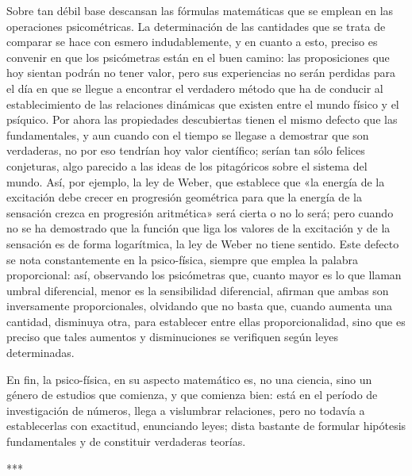 \documentclass[a4paper, 12pt]{article}
\begin{document}
Sobre tan débil base descansan las fórmulas matemáticas que se emplean en las operaciones psicométricas. La determinación de las cantidades que se trata de comparar se hace con esmero indudablemente, y en cuanto a esto, preciso es convenir en que los psicómetras están en el buen camino: las proposiciones que hoy sientan podrán no tener valor, pero sus experiencias no serán perdidas para el día en que se llegue a encontrar el verdadero método que ha de conducir al establecimiento de las relaciones dinámicas que existen entre el mundo físico y el psíquico. Por ahora las propiedades descubiertas tienen el mismo defecto que las fundamentales, y aun cuando con el tiempo se llegase a demostrar que son verdaderas, no por eso tendrían hoy valor científico; serían tan sólo felices conjeturas, algo parecido a las ideas de los pitagóricos sobre el sistema del mundo. Así, por ejemplo, la ley de Weber, que establece que «la energía de la excitación debe crecer en progresión geométrica para que la energía de la sensación crezca en progresión aritmética» será cierta o no lo será; pero cuando no se ha demostrado que la función que liga los valores de la excitación y de la sensación es de forma logarítmica, la ley de Weber no tiene
sentido. Este defecto se nota constantemente en la psico-física, siempre que emplea la palabra proporcional: así, observando los psicómetras que, cuanto mayor es lo que llaman umbral diferencial, menor es la sensibilidad diferencial, afirman que ambas son inversamente proporcionales, olvidando que no basta que, cuando aumenta una cantidad, disminuya otra, para establecer entre ellas proporcionalidad, sino que es preciso que tales aumentos y disminuciones se verifiquen según leyes determinadas.

En fin, la psico-física, en su aspecto matemático es, no una ciencia, sino un género de estudios que comienza, y que comienza bien: está en el período de investigación de números, llega a vislumbrar relaciones, pero no todavía a establecerlas con exactitud, enunciando leyes; dista bastante de formular hipótesis fundamentales y de constituir verdaderas teorías.


\bigskip

\centerline{***}
\end{document}
